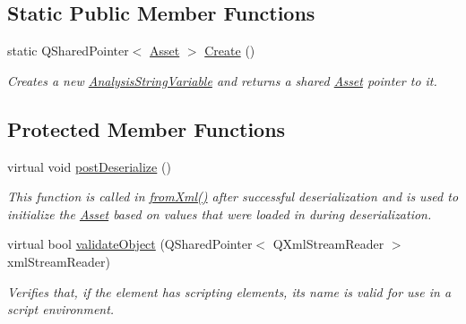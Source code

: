 \subsection*{Static Public Member Functions}
\begin{DoxyCompactItemize}
\item 
\hypertarget{class_picto_1_1_analysis_string_variable_a0f46966139a59e97f64c3edda43e6525}{static Q\-Shared\-Pointer$<$ \hyperlink{class_picto_1_1_asset}{Asset} $>$ \hyperlink{class_picto_1_1_analysis_string_variable_a0f46966139a59e97f64c3edda43e6525}{Create} ()}\label{class_picto_1_1_analysis_string_variable_a0f46966139a59e97f64c3edda43e6525}

\begin{DoxyCompactList}\small\item\em Creates a new \hyperlink{class_picto_1_1_analysis_string_variable}{Analysis\-String\-Variable} and returns a shared \hyperlink{class_picto_1_1_asset}{Asset} pointer to it. \end{DoxyCompactList}\end{DoxyCompactItemize}
\subsection*{Protected Member Functions}
\begin{DoxyCompactItemize}
\item 
virtual void \hyperlink{class_picto_1_1_analysis_string_variable_ad1d229ad548ade0f6cacc5be895a9d27}{post\-Deserialize} ()
\begin{DoxyCompactList}\small\item\em This function is called in \hyperlink{class_picto_1_1_asset_a8bed4da09ecb1c07ce0dab313a9aba67}{from\-Xml()} after successful deserialization and is used to initialize the \hyperlink{class_picto_1_1_asset}{Asset} based on values that were loaded in during deserialization. \end{DoxyCompactList}\item 
\hypertarget{class_picto_1_1_analysis_string_variable_a3b3172492d3a79994f08bb2f412a39a0}{virtual bool \hyperlink{class_picto_1_1_analysis_string_variable_a3b3172492d3a79994f08bb2f412a39a0}{validate\-Object} (Q\-Shared\-Pointer$<$ Q\-Xml\-Stream\-Reader $>$ xml\-Stream\-Reader)}\label{class_picto_1_1_analysis_string_variable_a3b3172492d3a79994f08bb2f412a39a0}

\begin{DoxyCompactList}\small\item\em Verifies that, if the element has scripting elements, its name is valid for use in a script environment. \end{DoxyCompactList}\end{DoxyCompactItemize}
